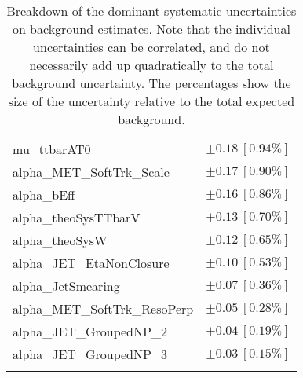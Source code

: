 \begin{table}
\begin{center}
\begin{tabular*}{\textwidth}{@{\extracolsep{\fill}}lc}
mu\_ttbarAT0         & $\pm 0.18\ [0.94\%] $       \\
alpha\_MET\_SoftTrk\_Scale         & $\pm 0.17\ [0.90\%] $       \\
alpha\_bEff         & $\pm 0.16\ [0.86\%] $       \\
alpha\_theoSysTTbarV         & $\pm 0.13\ [0.70\%] $       \\
alpha\_theoSysW         & $\pm 0.12\ [0.65\%] $       \\
alpha\_JET\_EtaNonClosure         & $\pm 0.10\ [0.53\%] $       \\
alpha\_JetSmearing         & $\pm 0.07\ [0.36\%] $       \\
alpha\_MET\_SoftTrk\_ResoPerp         & $\pm 0.05\ [0.28\%] $       \\
alpha\_JET\_GroupedNP\_2         & $\pm 0.04\ [0.19\%] $       \\
alpha\_JET\_GroupedNP\_3         & $\pm 0.03\ [0.15\%] $       \\
\noalign{\smallskip}\hline\noalign{\smallskip}
\end{tabular*}
\end{center}
\caption[Breakdown of uncertainty on background estimates]{
Breakdown of the dominant systematic uncertainties on background estimates.
Note that the individual uncertainties can be correlated, and do not necessarily add up quadratically to 
the total background uncertainty. The percentages show the size of the uncertainty relative to the total expected background.
\label{table.results.bkgestimate.uncertainties.SRA_T0}}
\end{table}
%